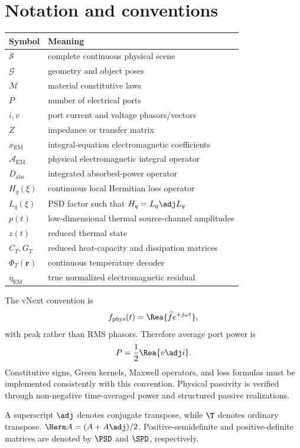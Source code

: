 \section{Notation and conventions}

\begin{center}
\begin{tabular}{ll}
\toprule
Symbol & Meaning\\
\midrule
$\mathcal S$ & complete continuous physical scene\\
$\mathcal G$ & geometry and object poses\\
$\mathcal M$ & material constitutive laws\\
$P$ & number of electrical ports\\
$i,v$ & port current and voltage phasors/vectors\\
$Z$ & impedance or transfer matrix\\
$x_{\mathrm{EM}}$ & integral-equation electromagnetic coefficients\\
$\mathcal A_{\mathrm{EM}}$ & physical electromagnetic integral operator\\
$D_{\mathrm{abs}}$ & integrated absorbed-power operator\\
$H_q(\xi)$ & continuous local Hermitian loss operator\\
$L_q(\xi)$ & PSD factor such that $H_q=L_q\adj L_q$\\
$p(t)$ & low-dimensional thermal source-channel amplitudes\\
$z(t)$ & reduced thermal state\\
$C_T,G_T$ & reduced heat-capacity and dissipation matrices\\
$\Phi_T(\mathbf r)$ & continuous temperature decoder\\
$\eta_{\mathrm{EM}}$ & true normalized electromagnetic residual\\
\bottomrule
\end{tabular}
\end{center}

The vNext convention is
\[
  f_{\rm phys}(t)=\Rea\{\widetilde f e^{+j\omega t}\},
\]
with peak rather than RMS phasors. Therefore average port power is
\[
  P=\frac12\Rea\{v\adj i\}.
\]
Constitutive signs, Green kernels, Maxwell operators, and loss formulas must be
implemented consistently with this convention. Physical passivity is verified
through non-negative time-averaged power and structured passive realizations.

A superscript $\adj$ denotes conjugate transpose, while $\T$ denotes ordinary
transpose. $\Herm A=(A+A\adj)/2$. Positive-semidefinite and
positive-definite matrices are denoted by $\PSD$ and $\SPD$, respectively.
